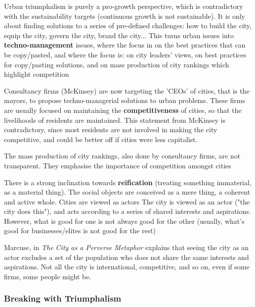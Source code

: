 \documentclass{article}
\begin{document}
\begin{outline}
  \1 Urban triumphalism is purely a pro-growth perspective, which is contradictory with the sustainability targets (continuous growth is not sustainable). 
  \1 It is only about finding solutions to a series of pre-defined challenges: how to build the city, equip the city, govern the city, brand the city... This turns urban issues into \textbf{techno-management} issues, where the focus in on the best practices that can be copy/pasted, and where the focus is: 
  	\2 on city leaders' views, 
	\2 on best practices for copy/pasting solutions, and 
  	\2 on mass production of city rankings which highlight competition

  \1 Consultancy firms (McKinsey) are now targeting the 'CEOs' of cities, that is the mayors, to propose techno-managerial solutions to urban problems. 
These firms are usually focused on maintaining the \textbf{competitiveness} of cities, so that the livelihoods of residents are maintained. This statement from McKinsey is contradictory, since most residents are not involved in making the city competitive, and could be better off if cities were less capitalist.

The mass production of city rankings, also done by consultancy firms, are not transparent. They emphasise the importance of competition amongst cities

  \1 There is a strong inclination towards \textbf{reification} (treating something immaterial, as a material thing). 
  	\2 The social objects are conceived as a mere thing, a coherent and active whole. Cities are viewed as actors
	\2 The city is viewed as an actor ("the city does this"), and acts according to a series of shared interests and aspirations. However, what is good for one is not always good for the other (usually, what's good for businesses/elites is not good for the rest) 
\end{outline}

Marcuse, in \textit{The City as a Perverse Metaphor} explains that seeing the city as an actor excludes a set of the population who does not share the same interests and aspirations. Not all the city is international, competitive, and so on, even if some firms, some people might be. 

\subsubsection{Breaking with Triumphalism}
\end{document}
